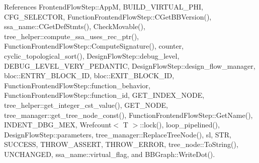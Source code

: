 References Frontend\+Flow\+Step\+::\+AppM, B\+U\+I\+L\+D\+\_\+\+V\+I\+R\+T\+U\+A\+L\+\_\+\+P\+HI, C\+F\+G\+\_\+\+S\+E\+L\+E\+C\+T\+OR, Function\+Frontend\+Flow\+Step\+::\+C\+Get\+B\+B\+Version(), ssa\+\_\+name\+::\+C\+Get\+Def\+Stmts(), Check\+Movable(), tree\+\_\+helper\+::compute\+\_\+ssa\+\_\+uses\+\_\+rec\+\_\+ptr(), Function\+Frontend\+Flow\+Step\+::\+Compute\+Signature(), counter, cyclic\+\_\+topological\+\_\+sort(), Design\+Flow\+Step\+::debug\+\_\+level, D\+E\+B\+U\+G\+\_\+\+L\+E\+V\+E\+L\+\_\+\+V\+E\+R\+Y\+\_\+\+P\+E\+D\+A\+N\+T\+IC, Design\+Flow\+Step\+::design\+\_\+flow\+\_\+manager, bloc\+::\+E\+N\+T\+R\+Y\+\_\+\+B\+L\+O\+C\+K\+\_\+\+ID, bloc\+::\+E\+X\+I\+T\+\_\+\+B\+L\+O\+C\+K\+\_\+\+ID, Function\+Frontend\+Flow\+Step\+::function\+\_\+behavior, Function\+Frontend\+Flow\+Step\+::function\+\_\+id, G\+E\+T\+\_\+\+I\+N\+D\+E\+X\+\_\+\+N\+O\+DE, tree\+\_\+helper\+::get\+\_\+integer\+\_\+cst\+\_\+value(), G\+E\+T\+\_\+\+N\+O\+DE, tree\+\_\+manager\+::get\+\_\+tree\+\_\+node\+\_\+const(), Function\+Frontend\+Flow\+Step\+::\+Get\+Name(), I\+N\+D\+E\+N\+T\+\_\+\+D\+B\+G\+\_\+\+M\+EX, Wrefcount$<$ T $>$\+::lock(), loop\+\_\+pipelined(), Design\+Flow\+Step\+::parameters, tree\+\_\+manager\+::\+Replace\+Tree\+Node(), sl, S\+TR, S\+U\+C\+C\+E\+SS, T\+H\+R\+O\+W\+\_\+\+A\+S\+S\+E\+RT, T\+H\+R\+O\+W\+\_\+\+E\+R\+R\+OR, tree\+\_\+node\+::\+To\+String(), U\+N\+C\+H\+A\+N\+G\+ED, ssa\+\_\+name\+::virtual\+\_\+flag, and B\+B\+Graph\+::\+Write\+Dot().

